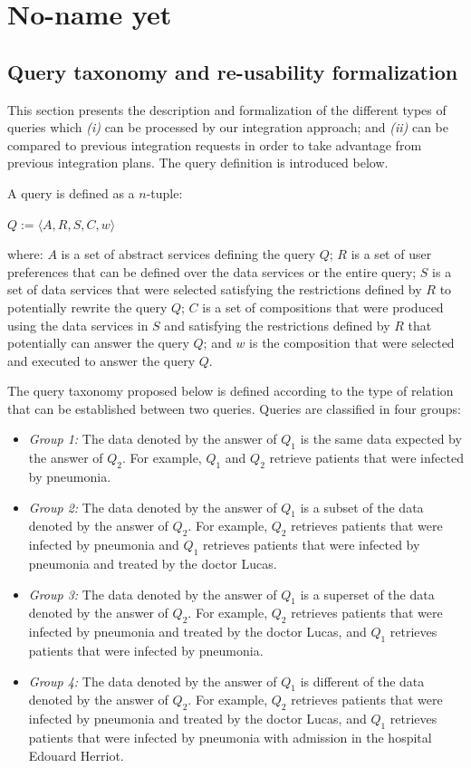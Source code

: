 \chapter{No-name yet}

\newpage

\section{Query taxonomy and re-usability formalization}

This section presents the description and formalization of the different types of queries which \textit{(i)} can be processed by our integration approach; and \textit{(ii)} can be compared to previous integration requests in order to take advantage from previous integration plans. The query definition is introduced below.

\begin{definition}
A query is defined as a $n$-tuple:
%
\begin{center}
$Q := \langle A, R, S, C, w  \rangle$
\end{center}
%
where: $A$ is a set of abstract services defining the query $Q$;
$R$ is a set of user preferences that can be defined over the data services or the entire query;
$S$ is a set of data services that were selected satisfying the restrictions defined by $R$ to potentially rewrite the query $Q$;
$C$ is a set of compositions that were produced using the data services in $S$ and satisfying the restrictions defined by $R$ that potentially can answer the query $Q$; and
$w$ is the composition that were selected and executed to answer the query $Q$. 
\end{definition}

The query taxonomy proposed below is defined according to the type of relation that can be established between two queries. 
Queries are classified in four groups: 
\begin{itemize}
\item \textit{Group 1:} The data denoted by the answer of $Q_{1}$ is the same data expected by the answer of $Q_{2}$. For example, $Q_{1}$ and $Q_{2}$ retrieve patients that were infected by pneumonia.
\item \textit{Group 2:} The data denoted by the answer of $Q_{1}$ is a subset of the data denoted by the answer of $Q_{2}$. For example, $Q_{2}$ retrieves patients that were infected by pneumonia and $Q_{1}$ retrieves patients that were infected by pneumonia and treated by the doctor Lucas.
\item \textit{Group 3:} The data denoted by the answer of $Q_{1}$ is a superset of the data denoted by the answer of $Q_{2}$. For example, $Q_{2}$ retrieves patients that were infected by pneumonia and treated by the doctor Lucas, and $Q_{1}$ retrieves patients that were infected by pneumonia.
\item \textit{Group 4:} The data denoted by the answer of $Q_{1}$ is different of the data denoted by the answer of $Q_{2}$. For example, $Q_{2}$ retrieves patients that were infected by pneumonia and treated by the doctor Lucas, and $Q_{1}$ retrieves patients that were infected by pneumonia with admission in the hospital Edouard Herriot.
\end{itemize}

